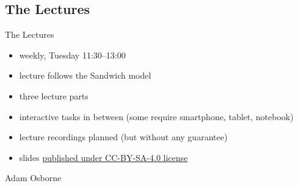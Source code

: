 
\subsection{The Lectures}
\begin{frame}{\insertsubsection}
	\begin{fancycolumns}[widths={60}]
		\begin{definition}{The Lectures}
			\begin{itemize}
				\item weekly, Tuesday 11:30--13:00
				\item lecture follows the Sandwich model
				\item three lecture parts
				\item interactive tasks in between (some require smartphone, tablet, notebook)
				\item lecture recordings planned (but without any guarantee)
				\item slides \href{https://github.com/TUBS-ISF/Course-on-Software-Engineering}{published under CC-BY-SA-4.0 license}
			\end{itemize}
		\end{definition}
	\nextcolumn
		\begin{note}{Adam Osborne} %
		\end{note}
	\end{fancycolumns}
\end{frame}

